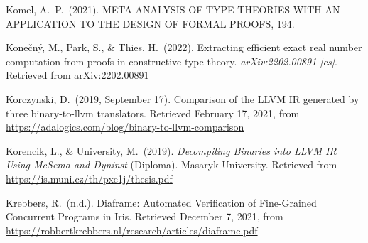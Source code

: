 \documentclass[12pt,twoside]{article}
\begin{document}
{\begin{thebibliography}{1079}
\mdbibitemlabel{}Komel, A.~P.~(2021). META-ANALYSIS OF TYPE THEORIES WITH AN APPLICATION TO THE DESIGN OF FORMAL PROOFS, 194.%

\mdbibitemlabel{}Konečný, M., Park, S., \& Thies, H.~(2022). Extracting efficient exact real number computation from proofs in constructive type theory. \emph{arXiv:2202.00891 {}[cs]}. Retrieved from arXiv:\href{http://arxiv.org/abs/2202.00891}{2202.00891}%

\mdbibitemlabel{}Korczynski, D.~(2019, September 17). Comparison of the LLVM IR generated by three binary-to-llvm translators. Retrieved February 17, 2021, from \href{https://adalogics.com/blog/binary-to-llvm-comparison}{{\ttfamily https://\hspace{0pt}adalogics.\hspace{0pt}com/\hspace{0pt}blog/\hspace{0pt}binary-\hspace{0pt}to-\hspace{0pt}llvm-\hspace{0pt}comparison}}%

\mdbibitemlabel{}Korencik, L., \& University, M.~(2019). \emph{Decompiling Binaries into LLVM IR Using McSema and Dyninst} (Diploma). Masaryk University. Retrieved from \href{https://is.muni.cz/th/pxe1j/thesis.pdf}{{\ttfamily https://\hspace{0pt}is.\hspace{0pt}muni.\hspace{0pt}cz/\hspace{0pt}th/\hspace{0pt}pxe1j/\hspace{0pt}thesis.\hspace{0pt}pdf}}%

\mdbibitemlabel{}Krebbers, R.~(n.d.). Diaframe: Automated Verification of Fine-Grained Concurrent Programs in Iris. Retrieved December 7, 2021, from \href{https://robbertkrebbers.nl/research/articles/diaframe.pdf}{{\ttfamily https://\hspace{0pt}robbertkrebbers.\hspace{0pt}nl/\hspace{0pt}research/\hspace{0pt}articles/\hspace{0pt}diaframe.\hspace{0pt}pdf}}%


\end{thebibliography}}
\end{document}
